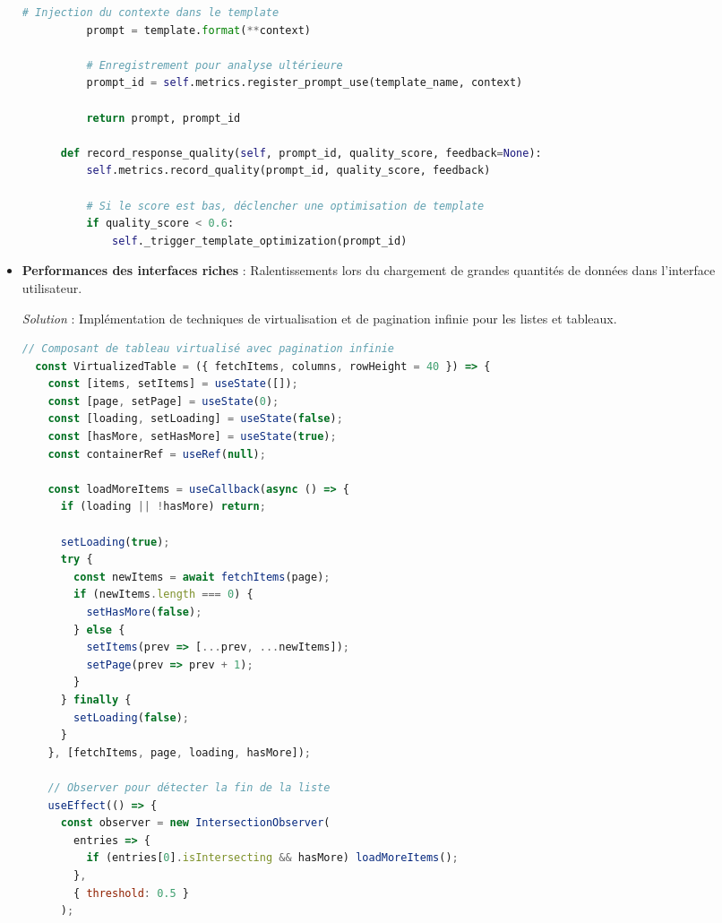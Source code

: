 \begin{itemize}
\begin{lstlisting}[style=codestyle, language=Python]
          # Injection du contexte dans le template
          prompt = template.format(**context)
          
          # Enregistrement pour analyse ultérieure
          prompt_id = self.metrics.register_prompt_use(template_name, context)
          
          return prompt, prompt_id
      
      def record_response_quality(self, prompt_id, quality_score, feedback=None):
          self.metrics.record_quality(prompt_id, quality_score, feedback)
          
          # Si le score est bas, déclencher une optimisation de template
          if quality_score < 0.6:
              self._trigger_template_optimization(prompt_id)
  \end{lstlisting}
  
  \item \textbf{Performances des interfaces riches} : Ralentissements lors du chargement de grandes quantités de données dans l'interface utilisateur.
  
  \textit{Solution} : Implémentation de techniques de virtualisation et de pagination infinie pour les listes et tableaux.
  
  \begin{lstlisting}[style=codestyle, language=JavaScript]
  // Composant de tableau virtualisé avec pagination infinie
  const VirtualizedTable = ({ fetchItems, columns, rowHeight = 40 }) => {
    const [items, setItems] = useState([]);
    const [page, setPage] = useState(0);
    const [loading, setLoading] = useState(false);
    const [hasMore, setHasMore] = useState(true);
    const containerRef = useRef(null);
    
    const loadMoreItems = useCallback(async () => {
      if (loading || !hasMore) return;
      
      setLoading(true);
      try {
        const newItems = await fetchItems(page);
        if (newItems.length === 0) {
          setHasMore(false);
        } else {
          setItems(prev => [...prev, ...newItems]);
          setPage(prev => prev + 1);
        }
      } finally {
        setLoading(false);
      }
    }, [fetchItems, page, loading, hasMore]);
    
    // Observer pour détecter la fin de la liste
    useEffect(() => {
      const observer = new IntersectionObserver(
        entries => {
          if (entries[0].isIntersecting && hasMore) loadMoreItems();
        },
        { threshold: 0.5 }
      );
      

\end{lstlisting}
\end{itemize}

